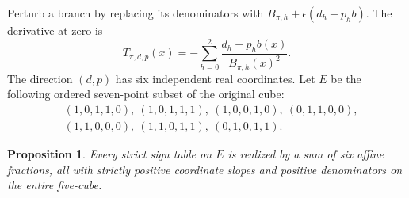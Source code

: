\documentclass[11pt]{article}
\newtheorem{proposition}{Proposition}
\begin{document}
Perturb a branch by replacing its denominators with
$B_{\pi,h}+\epsilon(d_h+p_hb)$. The derivative at zero is
\[
 T_{\pi,d,p}(x)=-\sum_{h=0}^2
            \frac{d_h+p_hb(x)}{B_{\pi,h}(x)^2}.
 \tag{1}\label{eq:tangent}
\]
The direction $(d,p)$ has six independent real coordinates. Let $E$
be the following ordered seven-point subset of the original cube:
\[
\begin{split}
 &(1,0,1,1,0),\ (1,0,1,1,1),\ (1,0,0,1,0),\ (0,1,1,0,0),\\
 &(1,1,0,0,0),\ (1,1,0,1,1),\ (0,1,0,1,1).
\end{split}
\]
\begin{proposition}
Every strict sign table on $E$ is realized by a sum of six affine
fractions, all with strictly positive coordinate slopes and positive
denominators on the entire five-cube.
\end{proposition}
\end{document}

